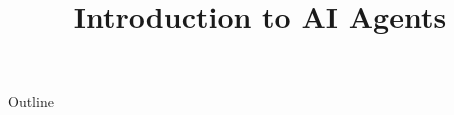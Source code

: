 \documentclass[xcolor=dvipsnames,compress,t,pdf,9pt]{beamer}
\title[\insertframenumber /\inserttotalframenumber]{Introduction to AI Agents}
\begin{document}
	\begin{frame}
	\titlepage
	\end{frame}
	
	\begin{frame}{Outline}
	    \tableofcontents
	\end{frame}

	
	
	
		
\end{document}
